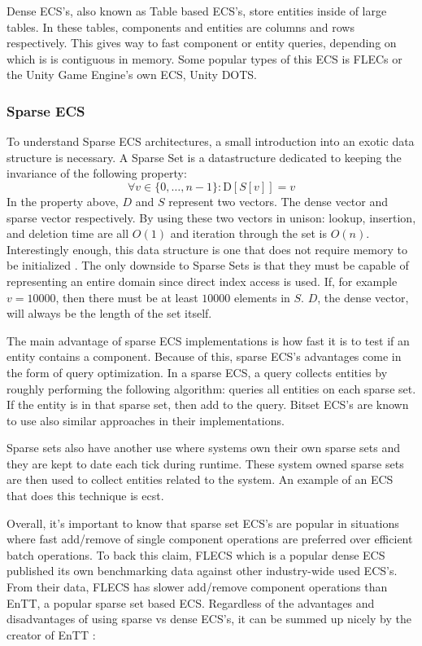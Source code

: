 Dense ECS's, also known as Table based ECS's, store entities inside of large tables. In these tables, components and entities are columns and rows respectively. This gives way to fast component or entity queries, depending on which is is contiguous in memory. Some popular types of this ECS is FLECs or the Unity Game Engine's own ECS, Unity DOTS. \cite{SanderMertensFAQ}

\subsubsection{Sparse ECS}
To understand Sparse ECS architectures, a small introduction into an exotic data structure is necessary. A Sparse Set is a datastructure dedicated to keeping the invariance of the following property:
\begin{equation*}
    \forall v \in \{0,\ldots, n-1\} : \text{D}[S[v]] = v
\end{equation*}
In the property above, $D$ and $S$ represent two vectors. The dense vector and sparse vector respectively. By using these two vectors in unison: lookup, insertion, and deletion time are all $O(1)$ and iteration through the set is $O(n)$. Interestingly enough, this data structure is one that does not require memory to be initialized \cite{sparse_profit}. The only downside to Sparse Sets is that they must be capable of representing an entire domain since direct index access is used. If, for example $v = 10000$, then there must be at least $10000$ elements in $S$. $D$, the dense vector, will always be the length of the set itself.

The main advantage of sparse ECS implementations is how fast it is to test if an entity contains a component. Because of this, sparse ECS's advantages come in the form of query optimization. In a sparse ECS, a query collects entities by roughly performing the following algorithm: queries all entities on each sparse set. If the entity is in that sparse set, then add to the query. Bitset ECS's are known to use also similar approaches in their implementations.\cite{EnTT_SparseSets}

Sparse sets also have another use where systems own their own sparse sets and they are kept to date each tick during runtime. These system owned sparse sets are then used to collect entities related to the system. An example of an ECS that does this technique is ecst. \cite{ecst}

Overall, it's important to know that sparse set ECS's are popular in situations where fast add/remove of single component operations are preferred over efficient batch operations. To back this claim, FLECS which is a popular dense ECS published its own benchmarking data against other industry-wide used ECS's. From their data, FLECS has slower add/remove component operations than EnTT, a popular sparse set based ECS.\cite{FLECS_EnTTCompare} Regardless of the advantages and disadvantages of using sparse vs dense ECS's, it can be summed up nicely by the creator of EnTT \cite{EnTT_archetype_and_quote}:


